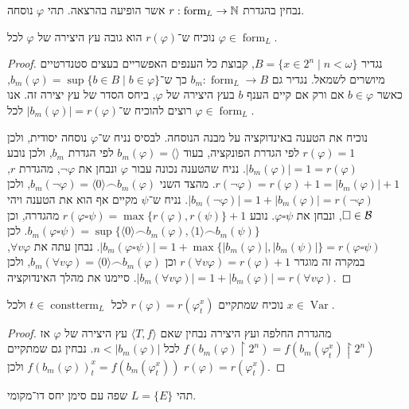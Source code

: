 \question{}
נבחין בהגדרת $r: \operatorname{form}_L \to \mathbb{N}$ אשר הופיעה בהרצאה.
תהי $\varphi$ נוסחה.

\subquestion{}
נוכיח ש־$r(\varphi)$ הוא גובה עץ היצירה של $\varphi$ לכל $\varphi \in \operatorname{form}_L$.
\begin{proof}
	נגדיר $B = \{ x \in 2^n \mid n < \omega\}$, קבוצת כל הענפים האפשריים בעצים סטנדרטיים מיושרים לשמאל.
	נגדיר גם $b_m : \operatorname{form}_L \to B$ כך ש־$b_m(\varphi) = \sup \{ b \in B \mid b \in \varphi \}$, כאשר $b \in \varphi$ אם ורק אם קיים הענף $b$ בעץ היצירה של $\varphi$, ביחס הסדר של עץ יצירה זה.
	אנו רוצים להוכיח ש־$|b_m(\varphi)| = r(\varphi)$ לכל $\varphi \in \operatorname{form}_L$.

	נוכיח את הטענה באינדוקציה על מבנה הנוסחה.
	לבסיס נניח ש־$\varphi$ נוסחה יסודית, ולכן $r(\varphi) = 1$ לפי הגדרת הפונקציה, בעוד $b_m(\varphi) = \langle \rangle$ לפי הגדרת $b_m$, ולכן נובע $|b_m(\varphi)| = 1 = r(\varphi)$.
	נניח שהטענה נכונה עבור $\varphi$ ונבחן את $\lnot \varphi$, מהגדרת $r$, $r(\lnot \varphi) = r(\varphi) + 1 = |b_m(\varphi)| + 1$.
	מהצד השני $b_m(\lnot \varphi) = \langle 0 \rangle \frown b_m(\varphi)$, ולכן $|b_m(\lnot \varphi)| = 1 + |b_m(\varphi)| = r(\lnot \varphi)$.
	נניח ש־$\psi$ מקיים אף הוא את הטענה ויהי $\square \in \mathcal{B}$, ונבחן את $\varphi \square \psi$.
	נובע $r(\varphi \square \psi) = \max\{r(\varphi), r(\psi)\} + 1$ מהגדרה, וכן $b_m(\varphi \square \psi) = \sup\{ \langle 0 \rangle \frown b_m(\varphi), \langle 1 \rangle \frown b_m(\psi)\}$.
	לכן $|b_m(\varphi \square \psi)| = 1 + \max\{|b_m(\varphi)|, |b_m(\psi)|\} = r(\varphi \square \psi)$.
	נבחן עתה את $\forall v \varphi$, במקרה זה מוגדר $r(\forall v \varphi) = r(\varphi) + 1$ וכן $b_m(\forall v \varphi) = \langle 0 \rangle \frown b_m(\varphi)$,
	ולכן $|b_m(\forall v \varphi)| = 1 + |b_m(\varphi)| = r(\forall v \varphi)$.
	סיימנו את מהלך האינדוקציה.
\end{proof}

\subquestion{}
נוכיח שמתקיים $r(\varphi) = r(\varphi_t^x)$ לכל $t \in \operatorname{constterm}_L$ ולכל $x \in \operatorname{Var}$.
\begin{proof}
	מהגדרת החלפה ועץ היצירה נבחין שאם $\langle T, f \rangle$ עץ היצירה של $\varphi$ אז $f(b_m(\varphi) \restriction 2^n) = f(b_m(\varphi_t^x) \restriction 2^n)$ לכל $n < |b_m(\varphi)|$.
	נבחין גם שמתקיים ${f(b_m(\varphi))}_t^x = f(b_m(\varphi_t^x))$ ולכן $r(\varphi) = r(\varphi_t^x)$.
\end{proof}

\question{}
תהי $L = \{ E \}$ שפה עם סימן יחס דו־מקומי.

